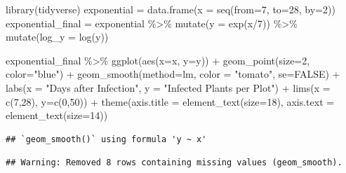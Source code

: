 \documentclass[
]{book}
\newenvironment{Shaded}{\begin{snugshade}}{\end{snugshade}}
\newcommand{\AttributeTok}[1]{\textcolor[rgb]{0.77,0.63,0.00}{#1}}
\newcommand{\ConstantTok}[1]{\textcolor[rgb]{0.00,0.00,0.00}{#1}}
\newcommand{\DecValTok}[1]{\textcolor[rgb]{0.00,0.00,0.81}{#1}}
\newcommand{\FunctionTok}[1]{\textcolor[rgb]{0.00,0.00,0.00}{#1}}
\newcommand{\NormalTok}[1]{#1}
\newcommand{\OtherTok}[1]{\textcolor[rgb]{0.56,0.35,0.01}{#1}}
\newcommand{\SpecialCharTok}[1]{\textcolor[rgb]{0.00,0.00,0.00}{#1}}
\newcommand{\StringTok}[1]{\textcolor[rgb]{0.31,0.60,0.02}{#1}}
\begin{document}
\begin{Shaded}
\begin{Highlighting}[]
\FunctionTok{library}\NormalTok{(tidyverse)}
\NormalTok{exponential }\OtherTok{=} \FunctionTok{data.frame}\NormalTok{(}\AttributeTok{x =} \FunctionTok{seq}\NormalTok{(}\AttributeTok{from=}\DecValTok{7}\NormalTok{, }\AttributeTok{to=}\DecValTok{28}\NormalTok{, }\AttributeTok{by=}\DecValTok{2}\NormalTok{))}
\NormalTok{exponential\_final }\OtherTok{=}\NormalTok{ exponential }\SpecialCharTok{\%\textgreater{}\%}
  \FunctionTok{mutate}\NormalTok{(}\AttributeTok{y =} \FunctionTok{exp}\NormalTok{(x}\SpecialCharTok{/}\DecValTok{7}\NormalTok{)) }\SpecialCharTok{\%\textgreater{}\%}
  \FunctionTok{mutate}\NormalTok{(}\AttributeTok{log\_y =} \FunctionTok{log}\NormalTok{(y)) }

\NormalTok{exponential\_final }\SpecialCharTok{\%\textgreater{}\%}
  \FunctionTok{ggplot}\NormalTok{(}\FunctionTok{aes}\NormalTok{(}\AttributeTok{x=}\NormalTok{x, }\AttributeTok{y=}\NormalTok{y)) }\SpecialCharTok{+}
  \FunctionTok{geom\_point}\NormalTok{(}\AttributeTok{size=}\DecValTok{2}\NormalTok{, }\AttributeTok{color=}\StringTok{"blue"}\NormalTok{) }\SpecialCharTok{+}
  \FunctionTok{geom\_smooth}\NormalTok{(}\AttributeTok{method=}\StringTok{\textquotesingle{}lm\textquotesingle{}}\NormalTok{, }\AttributeTok{color =} \StringTok{"tomato"}\NormalTok{, }\AttributeTok{se=}\ConstantTok{FALSE}\NormalTok{) }\SpecialCharTok{+} 
  \FunctionTok{labs}\NormalTok{(}\AttributeTok{x =} \StringTok{"Days after Infection"}\NormalTok{, }\AttributeTok{y =} \StringTok{"Infected Plants per Plot"}\NormalTok{) }\SpecialCharTok{+}
  \FunctionTok{lims}\NormalTok{(}\AttributeTok{x =} \FunctionTok{c}\NormalTok{(}\DecValTok{7}\NormalTok{,}\DecValTok{28}\NormalTok{), }\AttributeTok{y=}\FunctionTok{c}\NormalTok{(}\DecValTok{0}\NormalTok{,}\DecValTok{50}\NormalTok{)) }\SpecialCharTok{+}
  \FunctionTok{theme}\NormalTok{(}\AttributeTok{axis.title =} \FunctionTok{element\_text}\NormalTok{(}\AttributeTok{size=}\DecValTok{18}\NormalTok{),}
        \AttributeTok{axis.text =} \FunctionTok{element\_text}\NormalTok{(}\AttributeTok{size=}\DecValTok{14}\NormalTok{))}
\end{Highlighting}
\end{Shaded}

\begin{verbatim}
## `geom_smooth()` using formula 'y ~ x'
\end{verbatim}

\begin{verbatim}
## Warning: Removed 8 rows containing missing values (geom_smooth).
\end{verbatim}
\end{document}

